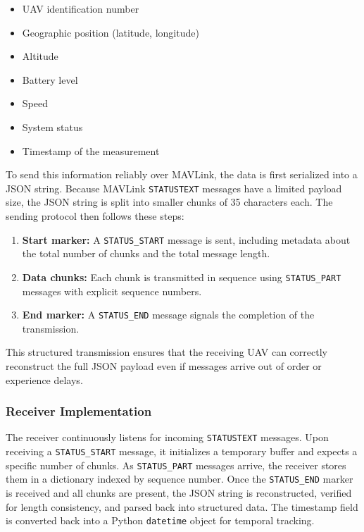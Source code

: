 \begin{itemize}
    \item UAV identification number
    \item Geographic position (latitude, longitude)
    \item Altitude
    \item Battery level
    \item Speed
    \item System status
    \item Timestamp of the measurement
\end{itemize}

To send this information reliably over MAVLink, the data is first serialized into a JSON string. Because MAVLink \texttt{STATUSTEXT} messages have a limited payload size, the JSON string is split into smaller chunks of 35 characters each. The sending protocol then follows these steps:

\begin{enumerate}
    \item \textbf{Start marker:} A \texttt{STATUS\_START} message is sent, including metadata about the total number of chunks and the total message length.
    \item \textbf{Data chunks:} Each chunk is transmitted in sequence using \texttt{STATUS\_PART} messages with explicit sequence numbers.
    \item \textbf{End marker:} A \texttt{STATUS\_END} message signals the completion of the transmission.
\end{enumerate}

This structured transmission ensures that the receiving UAV can correctly reconstruct the full JSON payload even if messages arrive out of order or experience delays.

\subsubsection{Receiver Implementation}

The receiver continuously listens for incoming \texttt{STATUSTEXT} messages. Upon receiving a \texttt{STATUS\_START} message, it initializes a temporary buffer and expects a specific number of chunks. As \texttt{STATUS\_PART} messages arrive, the receiver stores them in a dictionary indexed by sequence number. Once the \texttt{STATUS\_END} marker is received and all chunks are present, the JSON string is reconstructed, verified for length consistency, and parsed back into structured data. The timestamp field is converted back into a Python \texttt{datetime} object for temporal tracking.

